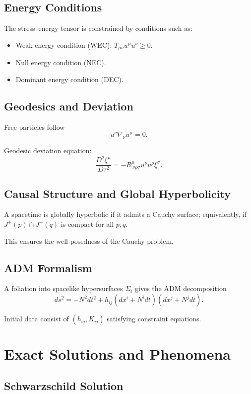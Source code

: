 \documentclass[12pt]{article}
\begin{document}
\subsection{Energy Conditions}

The stress--energy tensor is constrained by conditions such as:

\begin{itemize}
\item Weak energy condition (WEC): $T_{\mu\nu}u^\mu u^\nu\ge0$.
\item Null energy condition (NEC).
\item Dominant energy condition (DEC).
\end{itemize}

\subsection{Geodesics and Deviation}

Free particles follow
\[
u^\nu\nabla_\nu u^\mu=0.
\]

Geodesic deviation equation:
\[
\frac{D^2\xi^\mu}{D\tau^2}
= -R^\mu_{\ \nu\rho\sigma}u^\nu u^\rho \xi^\sigma.
\]

\subsection{Causal Structure and Global Hyperbolicity}

A spacetime is globally hyperbolic if it admits a Cauchy surface; 
equivalently, if $J^+(p)\cap J^-(q)$ is compact for all $p,q$.

This ensures the well-posedness of the Cauchy problem.

\subsection{ADM Formalism}

A foliation into spacelike hypersurfaces $\Sigma_t$ gives the ADM 
decomposition
\[
ds^2 = -N^2 dt^2 + h_{ij}(dx^i + N^i dt)(dx^j + N^j dt).
\]

Initial data consist of $(h_{ij},K_{ij})$ satisfying constraint equations.

\section{Exact Solutions and Phenomena}

\subsection{Schwarzschild Solution}
\end{document}
